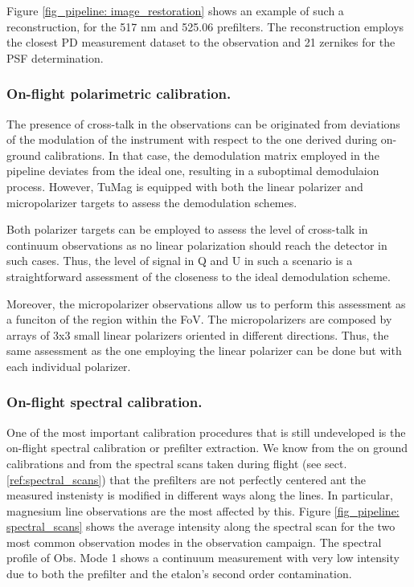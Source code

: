 Figure \ref{fig_pipeline:  image_restoration} shows an example of such a reconstruction, for the 517 nm and 525.06 prefilters. The reconstruction employs the closest PD measurement dataset to the observation and 21 zernikes for the PSF determination.   

\subsubsection{On-flight polarimetric calibration.}

The presence of cross-talk in the observations can be originated from deviations of the modulation of the instrument with respect to the one derived during on-ground calibrations. In that case, the demodulation matrix employed in the pipeline deviates from the ideal one, resulting in a suboptimal demodulaion process. However, TuMag is equipped with both the linear polarizer and micropolarizer targets to assess the demodulation schemes. 

Both polarizer targets can be employed to assess the level of cross-talk in continuum observations as no linear polarization should reach the detector in such cases. Thus, the level of signal in Q and U in such a scenario is a straightforward assessment of the closeness to the ideal demodulation scheme. 

Moreover, the micropolarizer observations allow us to perform this assessment as a funciton of the region within the FoV. The micropolarizers are composed by arrays of 3x3 small linear polarizers oriented in different directions. Thus, the same assessment as the one employing the linear polarizer can be done but with each individual polarizer. 


\subsubsection{On-flight spectral calibration.}

One of the most important calibration procedures that is still undeveloped is the on-flight spectral calibration or prefilter extraction. We know from the on ground calibrations and from the spectral scans taken during flight (see sect. \ref{ref:spectral_scans}) that the prefilters are not perfectly centered ant the measured instenisty is modified in different ways along the lines. In particular, magnesium line observations are the most affected by this. Figure \ref{fig_pipeline: spectral_scans} shows the average intensity along the spectral scan for the two most common observation modes in the observation campaign. The spectral profile of Obs. Mode 1 shows a continuum measurement with very low intensity due to both the prefilter and the etalon's second order contamination.

